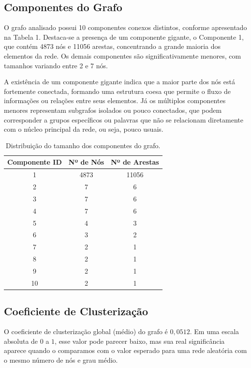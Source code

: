 \documentclass[12pt, a4paper]{article}
\begin{document}
\subsection{Componentes do Grafo}
O grafo analisado possui 10 componentes conexos distintos, conforme apresentado na Tabela 1. Destaca-se a presença de um componente gigante, o Componente 1, que contém 4873 nós e 11056 arestas, concentrando a grande maioria dos elementos da rede. Os demais componentes são significativamente menores, com tamanhos variando entre 2 e 7 nós.

A existência de um componente gigante indica que a maior parte dos nós está fortemente conectada, formando uma estrutura coesa que permite o fluxo de informações ou relações entre seus elementos. Já os múltiplos componentes menores representam subgrafos isolados ou pouco conectados, que podem corresponder a grupos específicos ou palavras que não se relacionam diretamente com o núcleo principal da rede, ou seja, pouco usuais.

\begin{table}[H]
\centering
\begin{tabular}{|c|c|c|}
\hline
\textbf{Componente ID} & \textbf{Nº de Nós} & \textbf{Nº de Arestas} \\
\hline
1 & 4873 & 11056 \\
\hline
2 & 7    & 6     \\
\hline
3 & 7    & 6     \\
\hline
4 & 7    & 6     \\
\hline
5 & 4    & 3     \\
\hline
6 & 3    & 2     \\
\hline
7 & 2    & 1     \\
\hline
8 & 2    & 1     \\
\hline
9 & 2    & 1     \\
\hline
10 & 2   & 1     \\
\hline
\end{tabular}
\caption{Distribuição do tamanho dos componentes do grafo.}
\end{table}

\subsection{Coeficiente de Clusterização}
O coeficiente de clusterização global (médio) do grafo é $0{,}0512$. Em uma escala absoluta de $0$ a $1$, esse valor pode parecer baixo, mas sua real significância aparece quando o comparamos com o valor esperado para uma rede aleatória com o mesmo número de nós e grau médio.
\end{document}
